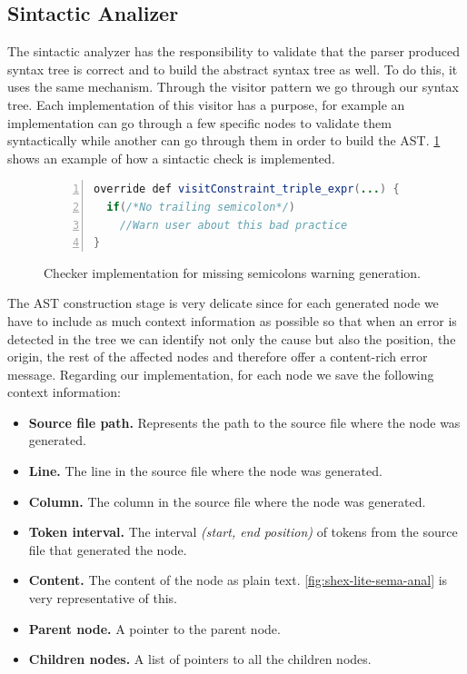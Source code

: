 \subsection{Sintactic Analizer}
The sintactic analyzer has the responsibility to validate that the parser produced syntax tree is correct and to build the abstract syntax
tree as well. To do this, it uses the same mechanism. Through the visitor pattern we go through our syntax tree. Each implementation
of this visitor has a purpose, for example an implementation can go through a few specific nodes to validate them syntactically
while another can go through them in order to build the AST. \cref{fig:checker-example} shows an example of how a sintactic check is
implemented.

\begin{figure}
    \begin{lstlisting}[language=Java,numbers=left,basicstyle=\ttfamily\scriptsize]
override def visitConstraint_triple_expr(...) {
  if(/*No trailing semicolon*/)
    //Warn user about this bad practice
}
    \end{lstlisting}
    \caption[Checker implementation for missing semicolons warning generation]{Checker implementation for missing semicolons warning generation.}
    \label{fig:checker-example}
\end{figure}

The AST construction stage is very delicate since for each generated node we have to include as much context information as possible
so that when an error is detected in the tree we can identify not only the cause but also the position, the origin, the rest of the
affected nodes and therefore offer a content-rich error message. Regarding our implementation, for each node we save the following
context information:
\begin{itemize}
    \item \textbf{Source file path.} Represents the path to the source file where the node was generated.
    \item \textbf{Line.} The line in the source file where the node was generated.
    \item \textbf{Column.} The column in the source file where the node was generated.
    \item \textbf{Token interval.} The interval \textit{(start, end position)} of tokens from the source file that generated the node.
    \item \textbf{Content.} The content of the node as plain text. \cref{fig:shex-lite-sema-anal} is very representative of this. 
    \item \textbf{Parent node.} A pointer to the parent node.
    \item \textbf{Children nodes.} A list of pointers to all the children nodes.
\end{itemize}

